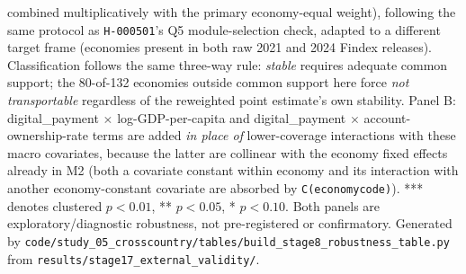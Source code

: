 \begin{table}[htbp]
\begin{minipage}{\linewidth}
combined multiplicatively with the primary economy-equal weight), following the
same protocol as \texttt{H-000501}'s Q5 module-selection check, adapted to a
different target frame (economies present in both raw 2021 and 2024 Findex releases).
Classification follows the same three-way rule: \emph{stable} requires adequate common
support; the 80-of-132 economies outside common support here
force \emph{not transportable} regardless of the reweighted point estimate's own stability.
Panel B: digital\_payment $\times$ log-GDP-per-capita and digital\_payment $\times$
account-ownership-rate terms are added \emph{in place of} lower-coverage interactions
with these macro covariates, because the latter are collinear with the economy fixed
effects already in M2 (both a covariate constant within economy and its interaction with
another economy-constant covariate are absorbed by \texttt{C(economycode)}). *** denotes
clustered $p<0.01$, ** $p<0.05$, * $p<0.10$. Both panels are exploratory/diagnostic
robustness, not pre-registered or confirmatory. Generated by
\texttt{code/\allowbreak{}study\_05\_crosscountry/\allowbreak{}tables/\allowbreak{}build\_stage8\_robustness\_table.py} from
\texttt{results/\allowbreak{}stage17\_external\_validity/\allowbreak{}}.
\end{minipage}
\end{table}
